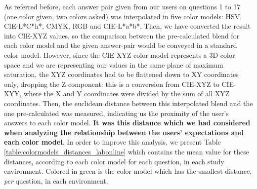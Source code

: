 %
As referred before, each answer pair given from our users on questions 1 to 17 (one color given, two colors asked) was interpolated in five color models:
HSV, CIE-L*C*h*, CMYK, RGB and CIE-L*a*b*. Then, we have converted the result into CIE-XYZ values, so the comparison between the pre-calculated blend for
each color model and the given answer-pair would be conveyed in a standard color model. However, since the CIE-XYZ color model represents a 3D color space
and we are representing our values in the same plane of maximum saturation, the XYZ coordinates had to be flattened down to XY coordinates only, dropping
the Z component: this is a conversion from CIE-XYZ to CIE-XYY, where the X and Y coordinates were divided by the sum of all XYZ coordinates. Then, the
euclidean distance between this interpolated blend and the one pre-calculated was measured, indicating us the proximity of the user's answers to each
color model. \textbf{It was this distance which we had considered when analyzing the relationship between the users' expectations and each color model}.
In order to improve this analysis, we present Table \ref{table:colormodels_distances_labonline} which contains the mean value for these distances,
according to each color model for each question, in each study environment. Colored in green is the color model which has the
smallest distance, \emph{per} question, in each environment. \par
%
%

